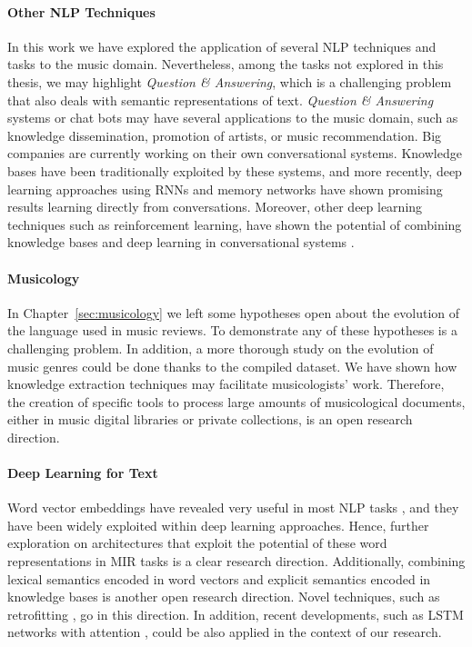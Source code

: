 \paragraph{Other NLP Techniques} In this work we have explored the application of several NLP techniques and tasks to the music domain. Nevertheless, among the tasks not explored in this thesis, we may highlight \textit{Question \& Answering}, which is a challenging problem that also deals with semantic representations of text. \textit{Question \& Answering} systems or chat bots may have several applications to the music domain, such as knowledge dissemination, promotion of artists, or music recommendation. Big companies are currently working on their own conversational systems. Knowledge bases have been traditionally exploited by these systems, and more recently, deep learning approaches using RNNs and memory networks have shown promising results learning directly from conversations. Moreover, other deep learning techniques such as reinforcement learning, have shown the potential of combining knowledge bases and deep learning in conversational systems \citep{andreas2016learning}.

\paragraph{Musicology}
In Chapter~\ref{sec:musicology} we left some hypotheses open about the evolution of the language used in music reviews. To demonstrate any of these hypotheses is a challenging problem. In addition, a more thorough study on the evolution of music genres could be done thanks to the compiled dataset. We have shown how knowledge extraction techniques may facilitate musicologists' work. Therefore, the creation of specific tools to process large amounts of musicological documents, either in music digital libraries or private collections, is an open research direction.

\paragraph{Deep Learning for Text} Word vector embeddings have revealed very useful in most NLP tasks \citep{Collobert2011}, and they have been widely exploited within deep learning approaches. Hence, further exploration on architectures that exploit the potential of these word representations in MIR tasks is a clear research direction. Additionally, combining lexical semantics encoded in word vectors and explicit semantics encoded in knowledge bases is another open research direction. Novel techniques, such as retrofitting \citep{faruqui2014retrofitting}, go in this direction. In addition, recent developments, such as LSTM networks with attention \citep{lin2017structured}, could be also applied in the context of our research.

